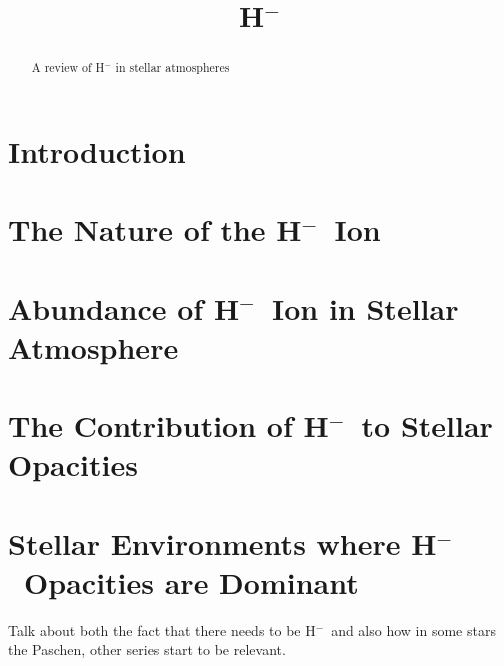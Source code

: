 \documentclass{emulateapj}
\def\h{H$^-$}
\begin{document}
\begin{abstract}
A review of H$^-$ in stellar atmospheres
\end{abstract}

\title{\h}

\section{Introduction}


\section{The Nature of the \h\ Ion}


\section{Abundance of \h\ Ion in Stellar Atmosphere}


\section{The Contribution of \h\ to Stellar Opacities}


\section{Stellar Environments where \h\ Opacities are Dominant}
Talk about both the fact that there needs to be \h\ and also how in
some stars the Paschen, other series start to be relevant.



\end{document}
